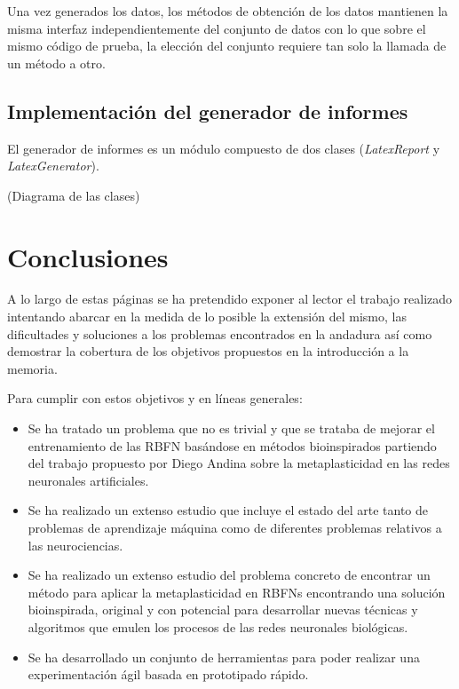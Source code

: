 \documentclass[10pt,a4paper]{report}
\begin{document}
Una vez generados los datos, los métodos de obtención de los datos mantienen la misma interfaz independientemente del conjunto de datos con lo que sobre el mismo código de prueba, la elección del conjunto requiere tan solo la llamada de un método a otro.

\section{Implementación del generador de informes}
El generador de informes es un módulo compuesto de dos clases (\textit{LatexReport} y \textit{LatexGenerator}). 

(Diagrama de las clases)


\chapter{Conclusiones}
A lo largo de estas páginas se ha pretendido exponer al lector el trabajo realizado intentando abarcar en la medida de lo posible la extensión del mismo, las dificultades y soluciones a los problemas encontrados en la andadura así como demostrar la cobertura de los objetivos propuestos en la introducción a la memoria.

Para cumplir con estos objetivos y en líneas generales:
\begin{itemize}
	\item Se ha tratado un problema que no es trivial y que se trataba de mejorar el entrenamiento de las RBFN basándose en métodos bioinspirados partiendo del trabajo propuesto por Diego Andina\citep{Andina2009} sobre la metaplasticidad en las redes neuronales artificiales. 
	\item Se ha realizado un extenso estudio que incluye el estado del arte tanto de problemas de aprendizaje máquina como de diferentes problemas relativos a las neurociencias. 
	\item Se ha realizado un extenso estudio del problema concreto de encontrar un método para aplicar la metaplasticidad en RBFNs encontrando una solución bioinspirada, original y con potencial para desarrollar nuevas técnicas y algoritmos que emulen los procesos de las redes neuronales biológicas.
	\item Se ha desarrollado un conjunto de herramientas para poder realizar una experimentación ágil basada en prototipado rápido.
\end{itemize}
\end{document}
